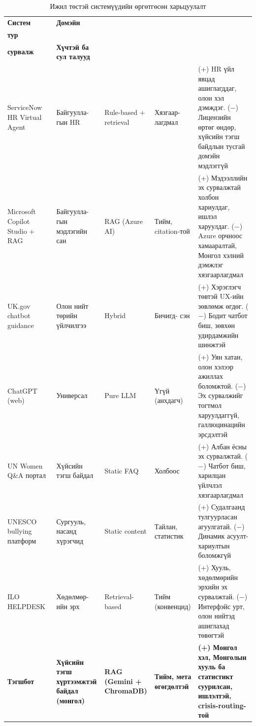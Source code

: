 \begin{table}[H]
\centering
\begin{tabular}{|p{2.6cm}|p{2.0cm}|p{1.8cm}|p{1.7cm}|p{4.6cm}|}
\hline
\textbf{Систем} & 
\textbf{Домэйн} & 
\shortstack{\textbf{Архитек-}\\\textbf{тур}} & 
\shortstack{\textbf{Эх}\\\textbf{сурвалж}} & 
\textbf{Хүчтэй ба сул талууд} \\ \hline
ServiceNow HR Virtual Agent~\cite{servicenow_hr_va} &  Байгуулла- гын HR & Rule-based + retrieval & Хязгаар-лагдмал & (+) HR үйл явцад ашиглагддаг, олон хэл дэмждэг. ($-$) Лицензийн өртөг өндөр, хүйсийн тэгш байдлын тусгай домэйн мэдлэггүй \\ \hline
Microsoft Copilot Studio + RAG~\cite{ms_copilot_rag} &  Байгуулла- 
гын мэдлэгийн сан & RAG (Azure AI) & Тийм, citation-той & (+) Мэдээллийн эх сурвалжтай холбон хариулдаг, ишлэл харуулдаг. ($-$) Azure орчноос хамааралтай, Монгол хэлний дэмжлэг хязгаарлагдмал \\ \hline
UK.gov chatbot guidance~\cite{govuk_chat_guidance} & Олон нийт төрийн үйлчилгээ & Hybrid &  Бичигд- сэн & (+) Хэрэглэгч төвтэй UX-ийн зөвлөмж өгдөг. ($-$) Бодит чатбот биш, зөвхөн удирдамжийн шинжтэй \\ \hline
ChatGPT (web)~\cite{instruct_gpt,gpt3} & Универсал & Pure LLM & Үгүй (анхдагч) & (+) Уян хатан, олон хэлээр ажиллах боломжтой. ($-$) Эх сурвалжийг тогтмол харуулдаггүй, галлюцинацийн эрсдэлтэй \\ \hline
UN Women Q\&A портал~\cite{gender_equality_general} & Хүйсийн тэгш байдал & Static FAQ & Холбоос & (+) Албан ёсны эх сурвалжтай. ($-$) Чатбот биш, харилцан үйлчлэл хязгаарлагдмал \\ \hline
UNESCO bullying платформ~\cite{school_bullying_unesco} & Сургууль, насанд хүрэгчид & Static content & Тайлан, статистик & (+) Судалгаанд тулгуурласан агуулгатай. ($-$) Динамик асуулт-хариултын боломжгүй \\ \hline
{\fontsize{9}{7}\selectfont ILO HELPDESK}~\cite{ilo_c111} & Хөдөлмөр-ийн эрх & Retrieval-based & Тийм (конвенцид) & (+) Хууль, хөдөлмөрийн эрхийн эх сурвалжтай. ($-$) Интерфэйс урт, олон нийтэд ашиглахад төвөгтэй \\ \hline
\textbf{Тэгшбот} & \textbf{Хүйсийн тэгш хүртээмжтэй байдал (монгол)} & \textbf{\fontsize{9}{7}\selectfont RAG (Gemini + ChromaDB)} & \textbf{Тийм, мета өгөгдөлтэй} & \textbf{(+) Монгол хэл, Монголын хууль ба статистикт суурилсан, ишлэлтэй, crisis-routing-той} \\ \hline
\end{tabular}
\caption[Ижил төстэй системүүдийн харьцуулалт]{Ижил төстэй системүүдийн өргөтгөсөн харьцуулалт}
\label{tab:similar_systems}
\end{table}


